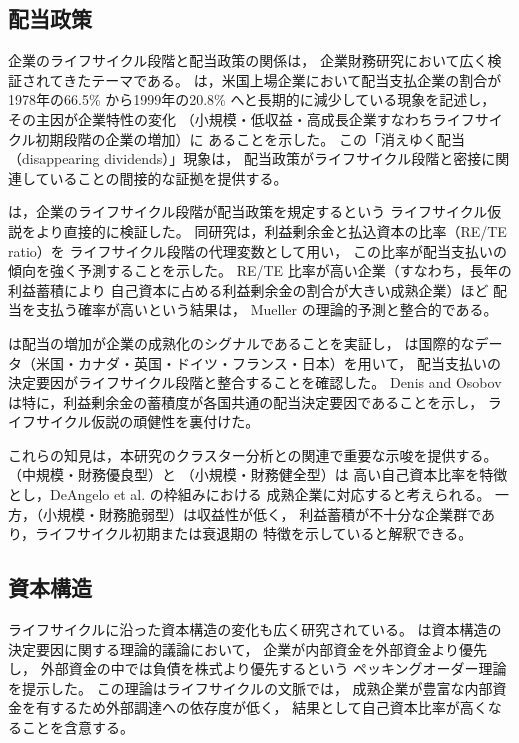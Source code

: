 \subsection{配当政策}

企業のライフサイクル段階と配当政策の関係は，
企業財務研究において広く検証されてきたテーマである。
 は，米国上場企業において配当支払企業の割合が
1978年の66.5\% から1999年の20.8\% へと長期的に減少している現象を記述し，
その主因が企業特性の変化
（小規模・低収益・高成長企業すなわちライフサイクル初期段階の企業の増加）に
あることを示した。
この「消えゆく配当（disappearing dividends）」現象は，
配当政策がライフサイクル段階と密接に関連していることの間接的な証拠を提供する。

 は，企業のライフサイクル段階が配当政策を規定するという
ライフサイクル仮説をより直接的に検証した。
同研究は，利益剰余金と払込資本の比率（RE/TE ratio）を
ライフサイクル段階の代理変数として用い，
この比率が配当支払いの傾向を強く予測することを示した。
RE/TE 比率が高い企業（すなわち，長年の利益蓄積により
自己資本に占める利益剰余金の割合が大きい成熟企業）ほど
配当を支払う確率が高いという結果は，
Mueller の理論的予測と整合的である。

 は配当の増加が企業の成熟化のシグナルであることを実証し，
 は国際的なデータ（米国・カナダ・英国・ドイツ・フランス・日本）を用いて，
配当支払いの決定要因がライフサイクル段階と整合することを確認した。
Denis and Osobov は特に，利益剰余金の蓄積度が各国共通の配当決定要因であることを示し，
ライフサイクル仮説の頑健性を裏付けた。

これらの知見は，本研究のクラスター分析との関連で重要な示唆を提供する。
（中規模・財務優良型）と （小規模・財務健全型）は
高い自己資本比率を特徴とし，DeAngelo et al. の枠組みにおける
成熟企業に対応すると考えられる。
一方，（小規模・財務脆弱型）は収益性が低く，
利益蓄積が不十分な企業群であり，ライフサイクル初期または衰退期の
特徴を示していると解釈できる。

\subsection{資本構造}

ライフサイクルに沿った資本構造の変化も広く研究されている。
 は資本構造の決定要因に関する理論的議論において，
企業が内部資金を外部資金より優先し，
外部資金の中では負債を株式より優先するという
ペッキングオーダー理論を提示した。
この理論はライフサイクルの文脈では，
成熟企業が豊富な内部資金を有するため外部調達への依存度が低く，
結果として自己資本比率が高くなることを含意する。

